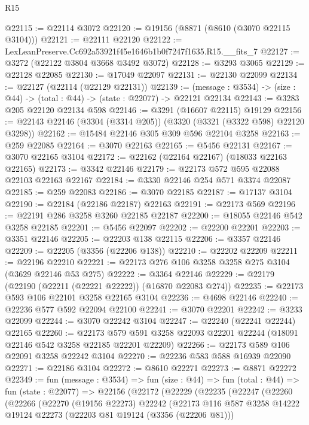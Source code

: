 \begin{lexlean}{R15}
\begin{coremodule}
@22115 := @22114 @3072
@22120 := @19156 (@8871 (@8610 (@3070 @22115 @3104)))
@22121 := @22111 @22120
@22122 := LexLeanPreserve.Cc692a53921f45e1646b1b0f7247f1635.R15.__fits_7
@22127 := @3272 (@22122 @3804 @3668 @3492 @3072)
@22128 := @3293 @3065
@22129 := @22128 @22085
@22130 := @17049 @22097
@22131 := @22130 @22099
@22134 := @22127 (@22114 (@22129 @22131))
@22139 := (message : @3534) -> (size : @44) -> (total : @44) -> (state : @22077) -> @22121 @22134
@22143 := @3283 @205 @22120 @22134 @598
@22146 := @3291 (@16607 @22115) @19129
@22156 := @22143 @22146 (@3304 (@3314 @205)) (@3320 (@3321 (@3322 @598) @22120 @3298))
@22162 := @15484 @22146 @305 @309 @596 @22104 @3258
@22163 := @259 @22085
@22164 := @3070 @22163
@22165 := @5456 @22131
@22167 := @3070 @22165 @3104
@22172 := @22162 (@22164 @22167) (@18033 @22163 @22165)
@22173 := @3342 @22146
@22179 := @22173 @572 @595 @22088 @22103 @22163 @22167
@22184 := @3330 @22146 @254 @571 @3374 @22087
@22185 := @259 @22083
@22186 := @3070 @22185
@22187 := @17137 @3104
@22190 := @22184 (@22186 @22187) @22163
@22191 := @22173 @569
@22196 := @22191 @286 @3258 @3260 @22185 @22187
@22200 := @18055 @22146 @542 @3258 @22185
@22201 := @5456 @22097
@22202 := @22200 @22201
@22203 := @3351 @22146
@22205 := @22203 @138 @22115
@22206 := @3357 @22146
@22209 := @22205 (@3356 (@22206 @138))
@22210 := @22202 @22209
@22211 := @22196 @22210
@22221 := @22173 @276 @106 @3258 @3258 @275 @3104 (@3629 @22146 @53 @275)
@22222 := @3364 @22146
@22229 := @22179 (@22190 (@22211 (@22221 @22222)) (@16870 @22083 @274))
@22235 := @22173 @593 @106 @22101 @3258 @22165 @3104
@22236 := @4698 @22146
@22240 := @22236 @577 @592 @22094 @22100
@22241 := @3070 @22201
@22242 := @3233 @22099
@22244 := @3070 @22242 @3104
@22247 := @22240 (@22241 @22244) @22165
@22260 := @22173
    @579
    @591
    @3258
    @22093
    @22201
    @22244
    (@18091 @22146 @542 @3258 @22185 @22201 @22209)
@22266 := @22173 @589 @106 @22091 @3258 @22242 @3104
@22270 := @22236 @583 @588 @16939 @22090
@22271 := @22186 @3104
@22272 := @8610 @22271
@22273 := @8871 @22272
@22349 := fun (message : @3534) =>
  fun (size : @44) =>
  fun (total : @44) =>
  fun (state : @22077) =>
  @22156
    (@22172
      (@22229
        (@22235
          (@22247
            (@22260
              (@22266
                (@22270
                  (@19156 @22273)
                  @22242
                  (@22173
                    @116
                    @587
                    @3258
                    @14222
                    @19124
                    @22273
                    (@22203 @81 @19124 (@3356 (@22206 @81)))

\end{coremodule}
\end{lexlean}
